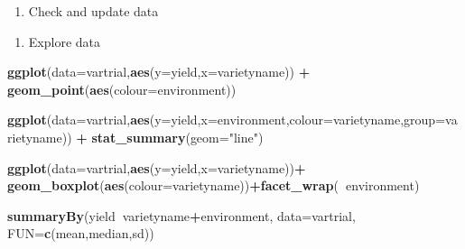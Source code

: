 \documentclass[]{book}
\newenvironment{Shaded}{\begin{snugshade}}{\end{snugshade}}
\newcommand{\KeywordTok}[1]{\textcolor[rgb]{0.13,0.29,0.53}{\textbf{#1}}}
\newcommand{\DataTypeTok}[1]{\textcolor[rgb]{0.13,0.29,0.53}{#1}}
\newcommand{\StringTok}[1]{\textcolor[rgb]{0.31,0.60,0.02}{#1}}
\newcommand{\OperatorTok}[1]{\textcolor[rgb]{0.81,0.36,0.00}{\textbf{#1}}}
\newcommand{\NormalTok}[1]{#1}
\providecommand{\tightlist}{%
  \setlength{\itemsep}{0pt}\setlength{\parskip}{0pt}}
\theoremstyle{definition}
\theoremstyle{definition}
\theoremstyle{definition}
\theoremstyle{remark}
\begin{document}
\begin{enumerate}
\def\labelenumi{\arabic{enumi}.}
\setcounter{enumi}{2}
\tightlist
\item
  Check and update data
\end{enumerate}

\begin{Shaded}
\end{Shaded}

\begin{enumerate}
\def\labelenumi{\arabic{enumi}.}
\setcounter{enumi}{3}
\tightlist
\item
  Explore data
\end{enumerate}

\begin{Shaded}
\begin{Highlighting}[]
\KeywordTok{ggplot}\NormalTok{(}\DataTypeTok{data=}\NormalTok{vartrial,}\KeywordTok{aes}\NormalTok{(}\DataTypeTok{y=}\NormalTok{yield,}\DataTypeTok{x=}\NormalTok{varietyname)) }\OperatorTok{+}
\StringTok{  }\KeywordTok{geom_point}\NormalTok{(}\KeywordTok{aes}\NormalTok{(}\DataTypeTok{colour=}\NormalTok{environment))}

\KeywordTok{ggplot}\NormalTok{(}\DataTypeTok{data=}\NormalTok{vartrial,}\KeywordTok{aes}\NormalTok{(}\DataTypeTok{y=}\NormalTok{yield,}\DataTypeTok{x=}\NormalTok{environment,}\DataTypeTok{colour=}\NormalTok{varietyname,}\DataTypeTok{group=}\NormalTok{varietyname)) }\OperatorTok{+}
\StringTok{  }\KeywordTok{stat_summary}\NormalTok{(}\DataTypeTok{geom=}\StringTok{"line"}\NormalTok{)}

\KeywordTok{ggplot}\NormalTok{(}\DataTypeTok{data=}\NormalTok{vartrial,}\KeywordTok{aes}\NormalTok{(}\DataTypeTok{y=}\NormalTok{yield,}\DataTypeTok{x=}\NormalTok{varietyname))}\OperatorTok{+}
\StringTok{  }\KeywordTok{geom_boxplot}\NormalTok{(}\KeywordTok{aes}\NormalTok{(}\DataTypeTok{colour=}\NormalTok{varietyname))}\OperatorTok{+}\KeywordTok{facet_wrap}\NormalTok{(}\OperatorTok{~}\NormalTok{environment)}


\KeywordTok{summaryBy}\NormalTok{(yield}\OperatorTok{~}\NormalTok{varietyname}\OperatorTok{+}\NormalTok{environment, }\DataTypeTok{data=}\NormalTok{vartrial, }\DataTypeTok{FUN=}\KeywordTok{c}\NormalTok{(mean,median,sd))}
\end{Highlighting}
\end{Shaded}
\end{document}
